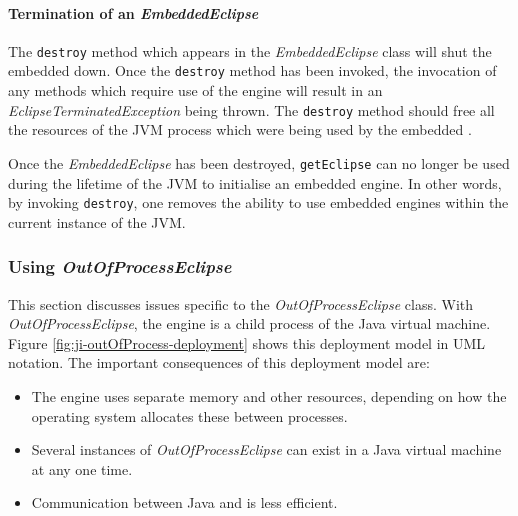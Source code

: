 \paragraph{Termination of an {\it EmbeddedEclipse}}

The {\tt destroy} method which appears in the {\it EmbeddedEclipse}
class will shut the embedded {\eclipse} down. Once the {\tt destroy}
method has been invoked, the invocation of any methods which require
use of the {\eclipse} engine will result in an {\it
EclipseTerminatedException} being thrown. The {\tt destroy} method
should free all the resources of the JVM process which were being used
by the embedded {\eclipse}.

Once the {\it EmbeddedEclipse} has been destroyed, {\tt getEclipse}
can no longer be used during the lifetime of the JVM to initialise an
embedded {\eclipse} engine. In other words, by invoking {\tt destroy},
one removes the ability to use embedded {\eclipse} engines within the
current instance of the JVM.

\subsubsection{Using {\it OutOfProcessEclipse}}

This section discusses issues specific to the {\it
OutOfProcessEclipse} class.  With {\it OutOfProcessEclipse}, the
{\eclipse} engine is a child process of the Java virtual
machine. Figure \ref{fig:ji-outOfProcess-deployment} shows this deployment
model in UML notation. The important consequences of this deployment
model are:

\begin{itemize}
\item The {\eclipse} engine uses separate memory and other resources, 
depending on how the operating system allocates these between processes. 
\item Several instances of {\it OutOfProcessEclipse} can exist in a Java 
virtual machine at any one time.
\item Communication between Java and {\eclipse} is less efficient.
\end{itemize}

